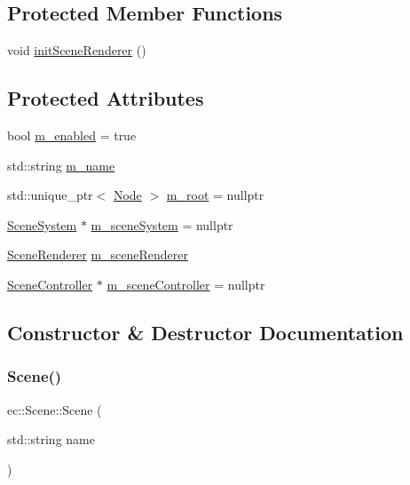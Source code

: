 \subsection*{Protected Member Functions}
\begin{DoxyCompactItemize}
\item 
void \mbox{\hyperlink{classec_1_1_scene_a137505b25a213810b1b477ad13daca7f}{init\+Scene\+Renderer}} ()
\end{DoxyCompactItemize}
\subsection*{Protected Attributes}
\begin{DoxyCompactItemize}
\item 
bool \mbox{\hyperlink{classec_1_1_scene_ad68ba7af20ecfbc45ee136842a38ccfe}{m\+\_\+enabled}} = true
\item 
std\+::string \mbox{\hyperlink{classec_1_1_scene_a58a25f1f2370535750e341085ddfd95b}{m\+\_\+name}}
\item 
std\+::unique\+\_\+ptr$<$ \mbox{\hyperlink{classec_1_1_node}{Node}} $>$ \mbox{\hyperlink{classec_1_1_scene_a7b7f1f4840087d56148e4c4be5737b50}{m\+\_\+root}} = nullptr
\item 
\mbox{\hyperlink{classec_1_1_scene_system}{Scene\+System}} $\ast$ \mbox{\hyperlink{classec_1_1_scene_ad63e472baf8e283c596891384ea98aad}{m\+\_\+scene\+System}} = nullptr
\item 
\mbox{\hyperlink{classec_1_1_scene_renderer}{Scene\+Renderer}} \mbox{\hyperlink{classec_1_1_scene_a17a2c241cec6bda0a5895b353aa28fa7}{m\+\_\+scene\+Renderer}}
\item 
\mbox{\hyperlink{classec_1_1_scene_controller}{Scene\+Controller}} $\ast$ \mbox{\hyperlink{classec_1_1_scene_aa6a8f71066fc44162b1c80341840d5fb}{m\+\_\+scene\+Controller}} = nullptr
\end{DoxyCompactItemize}


\subsection{Constructor \& Destructor Documentation}
\mbox{\label{classec_1_1_scene_a9abac0a0de42ff4e9eb6481cf1927754}} 
\subsubsection{\texorpdfstring{Scene()}{Scene()}}
{\footnotesize\ttfamily ec\+::\+Scene\+::\+Scene (\begin{DoxyParamCaption}\item[{std\+::string}]{name }\end{DoxyParamCaption})\hspace{0.3cm}{\ttfamily [explicit]}}

